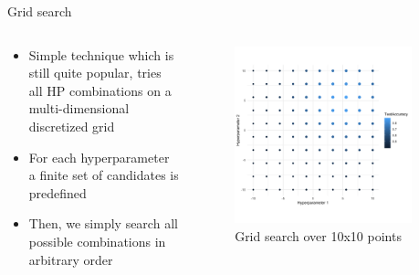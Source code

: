 
\subtitle{Grid and Random Search}




\maketitle




\begin{frame}{Grid search}

\begin{columns}
\begin{column}{0.49\textwidth}
\begin{itemize}
\item Simple technique which is still quite popular, tries all
HP combinations on a multi-dimensional discretized grid
\item For each hyperparameter a finite set of candidates is predefined
\item Then, we simply search all possible combinations in arbitrary order
\end{itemize}
\end{column}
\begin{column}{0.49\textwidth}
\vspace*{-0.8cm}
\begin{center}
\begin{figure}
\includegraphics[width=0.9\textwidth]{images/grid.png}
\caption*{Grid search over 10x10 points}
\end{figure}
\end{center}
\end{column}
\end{columns}


\end{frame}

